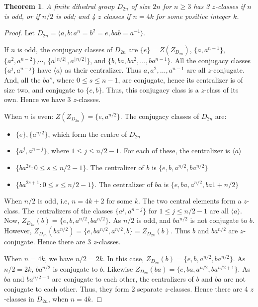 \documentclass[12pt,twoside,reqno]{amsart}
\newtheorem{theorem}{Theorem}[section]
\theoremstyle{definition}
\numberwithin{equation}{section}
\begin{document}
\begin{theorem}\label{z-classes-Dihedral-group}
    A finite dihedral group $D_{2n}$ of size $2n$ for $n\geq 3$ has 3 $z$-classes if $n$ is odd, or if $n/2$ is odd; and 4 $z$ classes if $n = 4k$ for some positive integer $k$.
\end{theorem}
\begin{proof}
Let $D_{2n} = \langle a, b: a^n = b^2 = e, bab = a^{-1}\rangle$.
    
If $n$ is odd, the conjugacy classes of $D_{2n}$ are $\{e\} = Z(Z_{D_{2n}})$, $\{a, a^{n-1}\}$, $\{a^2, a^{n-2}\}$,$\cdots$, $\{a^{\lfloor n/2\rfloor}, a^{\lceil n/2 \rceil}\}$,  and $\{b,ba,ba^2,\ldots,ba^{n-1}\}$. All the conjugacy classes $\{a^j, a^{n-j}\}$ have $\langle a \rangle$ as their centralizer. Thus $a,a^2,\ldots, a^{n-1}$ are all $z$-conjugate. And, all the $ba^s$, where $0 \leq s \leq n-1$, are conjugate, hence its centralizer is of size two, and conjugate to $\{e, b\}$. Thus, this conjugacy class is a $z$-class of its own. Hence we have 3 $z$-classes.

When $n$ is even: $Z(Z_{D_{2n}}) = \{e, a^{n/2}\}$. The conjugacy classes of $D_{2n}$ are:
\begin{itemize}
    \item $\{e\}, \{a^{n/2}\}$, which form the centre of $D_{2n}$
    \item  $\{a^j, a^{n-j}\}$, where $1 \leq j \leq n/2-1$. For each of these, the centralizer is $\langle a \rangle$
    \item $\{ba^{2s}: 0\leq s \leq n/2 -1\}$. The centralizer of $b$ is $\{e, b, a^{n/2}, ba^{n/2}\}$
    \item  $\{ba^{2s +1}: 0\leq s \leq n/2 -1\}$. The centralizer of $ba$ is $\{e, ba, a^{n/2}, ba{1 + n/2}\}$
\end{itemize}

When $n/2$ is odd, i.e, $n = 4k + 2$ for some $k$. The two central elements form a $z$-class. The centralizers of the classes $\{a^j, a^{n-j}\}$ for $1 \leq j \leq n/2 - 1$ are all $\langle a \rangle$. Now, $Z_{D_{2n}}(b) = \{e, b, a^{n/2}, ba^{n/2}\}$. As $n/2$ is odd, and $ba^{n/2}$ is not conjugate to $b$. However, $Z_{D_{2n}}(ba^{n/2}) = \{e, ba^{n/2}, a^{n/2}, b\} = Z_{D_{2n}}(b)$. Thus $b$ and $ba^{n/2}$ are $z$-conjugate. Hence there are 3 $z$-classes.

When $n = 4k$, we have $n/2 = 2k$. In this case, $Z_{D_{2n}}(b)= \{e, b, a^{n/2}, ba^{n/2}\}$. As $n/2 = 2k$, $ba^{n/2}$ is conjugate to $b$. Likewise $Z_{D_{2n}}(ba) = \{e, ba, a^{n/2}, ba^{n/2 + 1}\}$. As $ba$ and $ba^{n/2 + 1}$ are conjugate to each other, the centralizers of $b$ and $ba$ are not conjugate to each other. Thus, they form 2 separate $z$-classes. Hence there are 4 $z$-classes in $D_{2n}$, when $n = 4k$.
\end{proof}
\end{document}
